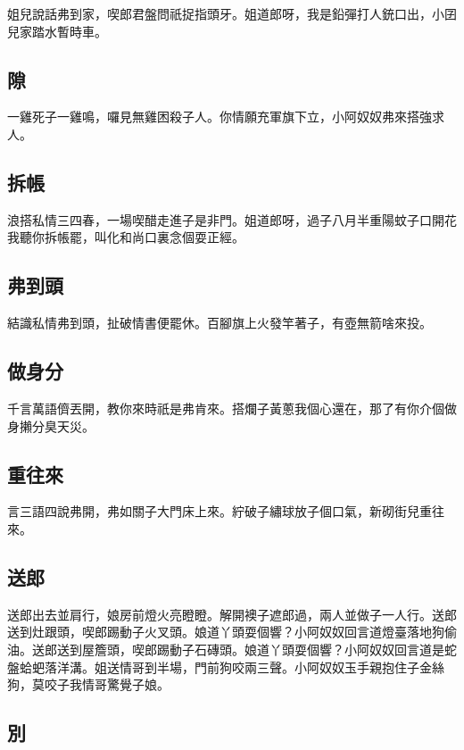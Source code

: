姐兒說話弗到家，喫郎君盤問祇捉指頭牙。姐道郎呀，我是鉛彈打人銃口出，小囝兒家踏水暫時車。

\subsection*{隙}

一雞死子一雞鳴，囉見無雞困殺子人。你情願充軍旗下立，小阿奴奴弗來搭強求人。

\subsection*{拆帳}

浪搭私情三四春，一場喫醋走進子是非門。姐道郎呀，過子八月半重陽蚊子口開花我聽你拆帳罷，叫化和尚口裏念個耍正經。

\subsection*{弗到頭}

結識私情弗到頭，扯破情書便罷休。百腳旗上火發竿著子，有壺無箭啥來投。

\subsection*{做身分}

千言萬語儕丟開，教你來時祇是弗肯來。搭爛子黃蔥我個心還在，那了有你介個做身攋分臭天災。

\subsection*{重往來}

言三語四說弗開，弗如關子大門床上來。紵破子繡球放子個口氣，新砌街兒重往來。

\subsection*{送郎}

送郎出去並肩行，娘房前燈火亮瞪瞪。解開襖子遮郎過，兩人並做子一人行。送郎送到灶跟頭，喫郎踢動子火叉頭。娘道丫頭耍個響？小阿奴奴回言道燈臺落地狗偷油。送郎送到屋簷頭，喫郎踢動子石磚頭。娘道丫頭耍個響？小阿奴奴回言道是蛇盤蛤蚆落洋溝。姐送情哥到半場，門前狗咬兩三聲。小阿奴奴玉手親抱住子金絲狗，莫咬子我情哥驚覺子娘。

\subsection*{別}

